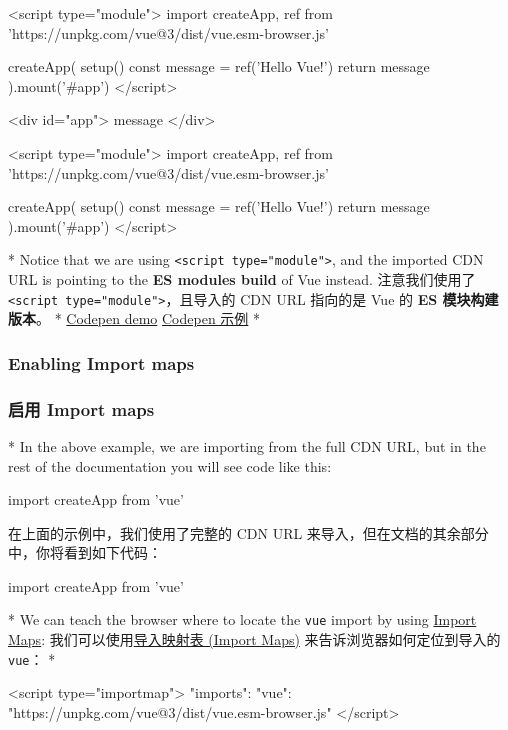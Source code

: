 \begin{paracol}{2}
\begin{codeHtml}
<script type="module">
    import { createApp, ref } from 'https://unpkg.com/vue@3/dist/vue.esm-browser.js'

    createApp({
    setup() {
        const message = ref('Hello Vue!')
        return {
        message
        }
    }
    }).mount('#app')
</script>
\end{codeHtml}  
\switchcolumn
\begin{codeHtml}
<div id="app">{{ message }}</div>

<script type="module">
    import { createApp, ref } from 'https://unpkg.com/vue@3/dist/vue.esm-browser.js'

    createApp({
    setup() {
        const message = ref('Hello Vue!')
        return {
        message
        }
    }
    }).mount('#app')
</script>
\end{codeHtml}  
\switchcolumn[0]*%
Notice that we are using
\texttt{\textless{}script\ type="module"\textgreater{}}, and the
imported CDN URL is pointing to the \textbf{ES modules build} of Vue
instead.
\switchcolumn
注意我们使用了
\texttt{\textless{}script\ type="module"\textgreater{}}，且导入的 CDN
URL 指向的是 Vue 的 \textbf{ES 模块构建版本}。
\switchcolumn[0]*%
\href{https://codepen.io/vuejs-examples/pen/MWzazEv}{Codepen demo}
\switchcolumn
\href{https://codepen.io/vuejs-examples/pen/MWzazEv}{Codepen 示例}
\switchcolumn[0]*%
\subsubsection{Enabling Import maps}
\switchcolumn
\subsubsection{启用 Import maps}
\switchcolumn[0]*%
In the above example, we are importing from the full CDN URL, but in the
rest of the documentation you will see code like this:
\begin{codeJs}
import { createApp } from 'vue'
\end{codeJs}  
\switchcolumn
在上面的示例中，我们使用了完整的 CDN URL
来导入，但在文档的其余部分中，你将看到如下代码：
\begin{codeJs}
import { createApp } from 'vue'
\end{codeJs}  
\switchcolumn[0]*%
We can teach the browser where to locate the \texttt{vue} import by
using \href{https://caniuse.com/import-maps}{Import Maps}:
\switchcolumn
我们可以使用\href{https://caniuse.com/import-maps}{导入映射表 (Import
Maps)} 来告诉浏览器如何定位到导入的 \texttt{vue}：
\switchcolumn[0]*%
\begin{codeHtml}
<script type="importmap">
{
    "imports": {
    "vue": "https://unpkg.com/vue@3/dist/vue.esm-browser.js"
    }
}
</script>


\end{codeHtml}
\end{paracol}
